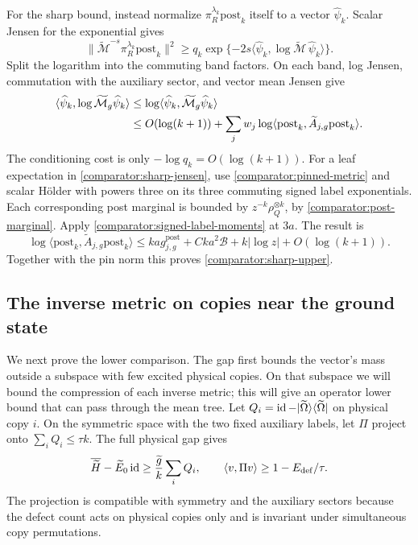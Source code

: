 For the sharp bound, instead normalize
$\pi_R^{\lambda_k}\mathrm{post}_k$ itself to a vector $\widehat\psi_k$.
Scalar Jensen for the exponential gives
\[
 \|\widetilde{\mathcal M}^{-s}\pi_R^{\lambda_k}\mathrm{post}_k\|^2
 \ge q_k\exp\{-2s\langle\widehat\psi_k,
                    \log\widetilde{\mathcal M}\,\widehat\psi_k\rangle\}.
\]
Split the logarithm into the commuting band factors.  On each band, log
Jensen, commutation with the auxiliary sector, and vector mean Jensen give
\begin{align}
 \langle\widehat\psi_k,
       \log\widetilde{\mathcal M}_g\widehat\psi_k\rangle
 &\le\log\langle\widehat\psi_k,
                         \widetilde{\mathcal M}_g\widehat\psi_k\rangle
       \notag\\
 &\le O(\log(k+1))+
       \sum_jw_j\log\langle\mathrm{post}_k,
                              \widetilde A_{j,g}\mathrm{post}_k\rangle.
 \label{comparator:sharp-jensen}
\end{align}
The conditioning cost is only $-\log q_k=O(\log(k+1))$.
For a leaf expectation in \eqref{comparator:sharp-jensen}, use
\eqref{comparator:pinned-metric} and scalar Hölder with powers three
on its three commuting signed label exponentials.  Each corresponding
post marginal is bounded by $z^{-k}\rho_Q^{\otimes k}$, by
\eqref{comparator:post-marginal}.  Apply
\eqref{comparator:signed-label-moments} at $3a$.  The result is
\[
 \log\langle\mathrm{post}_k,
                 \widetilde A_{j,g}\mathrm{post}_k\rangle
 \le ka g_{j,g}^{\mathrm{post}}+
                Cka^2\mathcal B+k|\log z|+O(\log(k+1)).
\]
Together with the pin norm this proves
\eqref{comparator:sharp-upper}.

\subsection{The inverse metric on copies near the ground state}

We next prove the lower comparison.  The gap first bounds the vector's
mass outside a subspace with few excited physical copies.  On that
subspace we will bound the compression of each inverse metric; this
will give an operator lower bound that can pass through the mean tree.
Let
$Q_i=\operatorname{id}-|\widetilde\Omega\rangle\langle\widetilde\Omega|$ on physical
copy $i$.  On the symmetric space with the two fixed auxiliary labels,
let $\Pi$ project onto $\sum_i Q_i\le\tau k$.  The full physical gap gives
\begin{equation}
 \overline{\widetilde H}-\widetilde E_0\operatorname{id}
       \ge\frac{\widetilde g}{k}\sum_iQ_i,
 \qquad
 \langle v,\Pi v\rangle\ge1-E_{\mathrm{def}}/\tau.
 \label{comparator:defect-mass}
\end{equation}
The projection is compatible with symmetry and the auxiliary sectors
because the defect count acts on physical copies only and is invariant
under simultaneous copy permutations.

